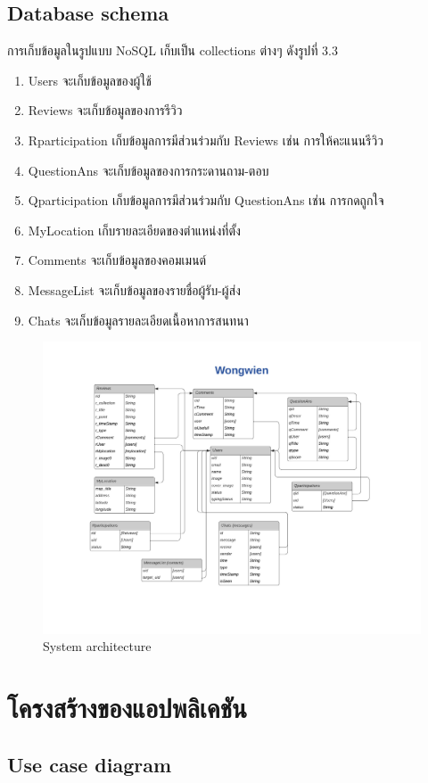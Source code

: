 \subsection{Database schema}
 การเก็บข้อมูลในรูปแบบ NoSQL เก็บเป็น collections ต่างๆ ดังรูปที่ 3.3 
\begin{enumerate}
  \item Users จะเก็บข้อมูลของผู้ใช้
  \item Reviews จะเก็บข้อมูลของการรีวิว
  \item Rparticipation เก็บข้อมูลการมีส่วนร่วมกับ Reviews เช่น การให้คะแนนรีวิว
  \item QuestionAns จะเก็บข้อมูลของการกระดานถาม-ตอบ
  \item Qparticipation เก็บข้อมูลการมีส่วนร่วมกับ QuestionAns เช่น การกดถูกใจ
  \item MyLocation เก็บรายละเอียดของตำแหน่งที่ตั้ง
  \item Comments จะเก็บข้อมูลของคอมเมนต์
  \item MessageList จะเก็บข้อมูลของรายชื่อผู้รับ-ผู้ส่ง
  \item Chats จะเก็บข้อมูลรายละเอียดเนื้อหาการสนทนา
\end{enumerate}
\begin{figure}[ht]
  \begin{center}
    \includegraphics[width=1\textwidth]{./image/database.jpeg}
  \end{center}
  \caption[Poem]{System architecture}
  \end{figure}


\section{โครงสร้างของแอปพลิเคชัน}
\subsection{Use case diagram}

